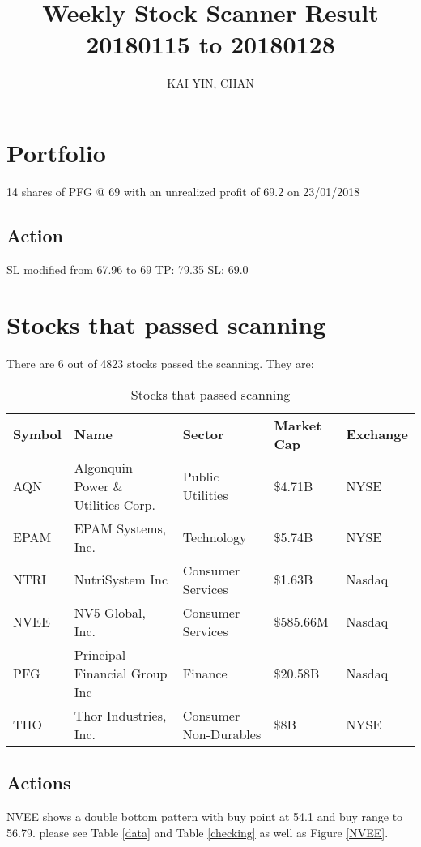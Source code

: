 \documentclass{article}
\begin{document}
\title{Weekly Stock Scanner Result \\ 20180115 to 20180128}
\author{KAI YIN, CHAN}
\maketitle

\section{Portfolio}
14 shares of PFG @ 69 with an unrealized profit of 69.2 on 23/01/2018

\subsection{Action}
SL modified from 67.96 to 69
TP: 79.35 SL: 69.0

\section{Stocks that passed scanning}

There are 6 out of 4823 stocks passed the scanning.  They are:
\begin{table}[htbp]
  \caption{Stocks that passed scanning}
    \begin{tabular}{lllll}
    	\textbf{Symbol} & \textbf{Name} & \textbf{Sector} & \textbf{Market Cap} & \textbf{Exchange} \\
    	AQN   & Algonquin Power \& Utilities Corp. & Public Utilities & \$4.71B & NYSE \\
    	EPAM  & EPAM Systems, Inc. & Technology & \$5.74B & NYSE \\
    	NTRI  & NutriSystem Inc & Consumer Services & \$1.63B & Nasdaq \\
    	NVEE  & NV5 Global, Inc. & Consumer Services & \$585.66M & Nasdaq \\
    	PFG   & Principal Financial Group Inc & Finance & \$20.58B & Nasdaq \\
    	THO   & Thor Industries, Inc. & Consumer Non-Durables & \$8B  & NYSE \\
    \end{tabular}%
    \label{tab:addlabel}%
\end{table}%

\subsection{Actions}
NVEE shows a double bottom pattern with buy point at 54.1 and buy range to 56.79. please see Table \ref{data} and Table \ref{checking} as well as Figure \ref{NVEE}.
\end{document}

